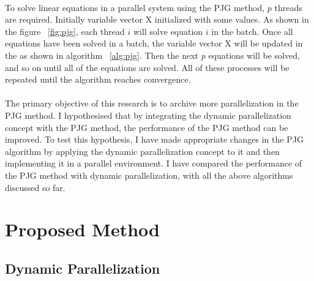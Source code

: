 \documentclass[11pt]{article}       %
\begin{document}
\noindent \\ To solve linear equations in a parallel system using the PJG method, $p$ threads are required. Initially variable vector X initialized with some values.     As shown in the figure ~\ref{fig:pjg}, each thread $i$ will solve equation $i$ in the batch. Once all equations have been solved in a batch, the variable vector X will be updated in the as shown in algorithm ~\ref{alg:pjg}. Then the next $p$ equations will be solved, and so on until all of the equations are solved. All of these processes will be repeated until the algorithm reaches convergence.
\\
\\
The primary objective of this research is to archive more parallelization in the PJG method. I hypothesised that by integrating the dynamic parallelization concept with the PJG method, the performance of the PJG method can be improved. To test this hypothesis, I have made appropriate changes in the PJG algorithm by applying the dynamic parallelization concept to it and then implementing it in a parallel environment. I have compared the performance of the PJG method with dynamic parallelization, with all the above algorithms discussed so far.


\section{Proposed Method} \label{proposed_method}

\subsection{Dynamic Parallelization} \label{dp}
\end{document}
